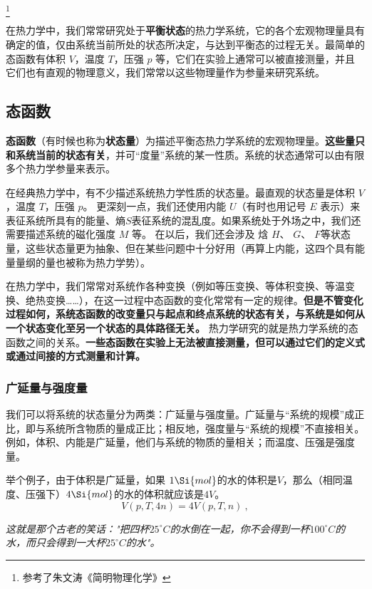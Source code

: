 \footnote{参考了朱文涛《简明物理化学》}


在热力学中，我们常常研究处于\textbf{平衡状态}的热力学系统，它的各个宏观物理量具有确定的值，仅由系统当前所处的状态所决定，与达到平衡态的过程无关。最简单的态函数有体积 $V$，温度 $T$，压强 $p$ 等，它们在实验上通常可以被直接测量，并且它们也有直观的物理意义，我们常常以这些物理量作为参量来研究系统。
\subsection{态函数}
\textbf{态函数}（有时候也称为\textbf{状态量}）为描述平衡态热力学系统的宏观物理量。\textbf{这些量只和系统当前的状态有关}，并可“度量”系统的某一性质。系统的状态通常可以由有限多个热力学参量来表示。

在经典热力学中，有不少描述系统热力学性质的状态量。最直观的状态量是体积 $V$，温度 $T$，压强 $p$。 更深刻一点，我们还使用内能 $U$（有时也用记号 $E$ 表示）来表征系统所具有的能量、熵$S$表征系统的混乱度。如果系统处于外场之中，我们还需要描述系统的磁化强度 $M$ 等。 在以后，我们还会涉及 焓 $H$、 $G$、 $F$等状态量，这些状态量更为抽象、但在某些问题中十分好用（再算上内能，这四个具有能量量纲的量也被称为热力学势）。

在热力学中，我们常常对系统作各种变换（例如等压变换、等体积变换、等温变换、绝热变换……），在这一过程中态函数的变化常常有一定的规律。\textbf{但是不管变化过程如何，系统态函数的改变量只与起点和终点系统的状态有关，与系统是如何从一个状态变化至另一个状态的具体路径无关。} 热力学研究的就是热力学系统的态函数之间的关系。\textbf{一些态函数在实验上无法被直接测量，但可以通过它们的定义式或通过间接的方式测量和计算。}

\subsubsection{广延量与强度量}
我们可以将系统的状态量分为两类：广延量与强度量。广延量与“系统的规模”成正比，即与系统所含物质的量成正比；相反地，强度量与“系统的规模”不直接相关。例如，体积、内能是广延量，他们与系统的物质的量相关；而温度、压强是强度量。

举个例子，由于体积是广延量，如果 $1 \Si {mol}$的水的体积是$V$，那么（相同温度、压强下）$4 \Si {mol}$的水的体积就应该是$4 V$。
$$
V(p,T,4n) = 4V(p,T,n)~,
$$

\textsl{这就是那个古老的笑话："把四杯$25 ^\circ C$的水倒在一起，你不会得到一杯$100 ^\circ C$的水，而只会得到一大杯$25 ^\circ C$的水"。}

